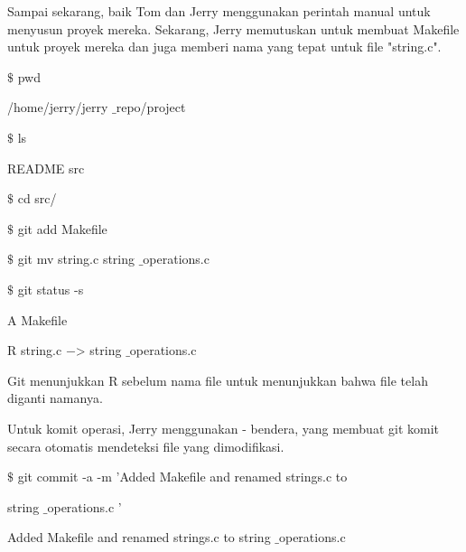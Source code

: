 Sampai sekarang, baik Tom dan Jerry menggunakan perintah manual untuk menyusun proyek mereka. Sekarang, Jerry memutuskan untuk membuat Makefile untuk proyek mereka dan juga memberi nama yang tepat untuk file "string.c". \par
\noindent 
{\fontsize{10pt}{10pt} $  \$  $ pwd} \par
\noindent 
{\fontsize{10pt}{10pt}\selectfont /home/jerry/jerry $  \_  $repo/project} \par
\noindent 
\vspace{10pt}
\noindent 
{\fontsize{10pt}{10pt} $  \$  $ ls} \par
\noindent 
{\fontsize{10pt}{10pt}\selectfont README src} \par
\noindent 
\vspace{10pt}
\noindent 
{\fontsize{10pt}{10pt} $  \$  $ cd src/} \par
\noindent 
\vspace{10pt}
\noindent 
{\fontsize{10pt}{10pt} $  \$  $ git add Makefile} \par
\noindent 
\vspace{10pt}
\noindent 
{\fontsize{10pt}{10pt} $  \$  $ git mv string.c string $  \_  $operations.c} \par
\noindent 
\vspace{10pt}
\noindent 
{\fontsize{10pt}{10pt} $  \$  $ git status -s} \par
\noindent 
{\fontsize{10pt}{10pt}\selectfont A Makefile} \par
\noindent 
{\fontsize{10pt}{10pt}\selectfont R string.c  $ - $> string $  \_  $operations.c} \par
\vspace{12pt}
Git menunjukkan R sebelum nama file untuk menunjukkan bahwa file telah diganti namanya. \par
Untuk komit operasi, Jerry menggunakan - bendera, yang membuat git komit secara otomatis mendeteksi file yang dimodifikasi. \par
{} $  \$  $ git commit -a -m 'Added Makefile and renamed strings.c to \par
\noindent 
string $  \_  $operations.c ' \par
\vspace{12pt}
\noindent 
[master 94f7b26] Added Makefile and renamed strings.c to string $  \_  $operations.c \par
